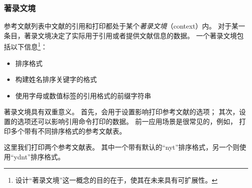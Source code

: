 \subsubsection{著录文境}%
\label{use:bib:context}


参考文献列表中文献的引用和打印都处于某个\emph{著录文境}（context）内。
对于某一条目，著录文境决定了实际用于引用或者提供文献信息的数据。
一个著录文境包括以下信息\footnote{
设计“著录文境”这一概念的目的在于，使其在未来具有可扩展性。}：

\begin{itemize}
 \item %
 排序格式
 \item %
 构建姓名排序关键字的格式
 \item %
 使用字母或数值标签的引用格式的前缀字符串
\end{itemize}
%
著录文境具有双重意义。
首先，会用于设置影响打印参考文献的选项；
其次，设置的选项还可以影响引用命令打印的数据。
前一应用场景是很常见的，例如，
打印多个带有不同排序格式的参考文献表。

\begin{ltxexample}
\usepackage[sorting=nyt]{biblatex}

\cite{one}
\cite{two}
\printbibliography
\newrefcontext[sorting=ydnt]
\printbibliography
\end{ltxexample}
%
这里我们打印两个参考文献表。
其中一个带有默认的“nyt”排序格式，另一个则使用“ydnt”排序格式。


